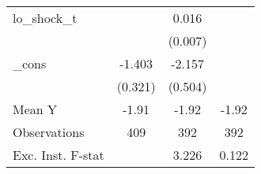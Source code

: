 {\begin{tabular}{l*{3}{c}}
\addlinespace
lo\_shock\_t  &                     &       0.016\sym{**} &                     \\
            &                     &     (0.007)         &                     \\
\addlinespace
\_cons      &      -1.403\sym{***}&      -2.157\sym{***}&                     \\
            &     (0.321)         &     (0.504)         &                     \\
\midrule
Mean Y      &       -1.91         &       -1.92         &       -1.92         \\
Observations&         409         &         392         &         392         \\
Exc. Inst. F-stat&                     &       3.226         &       0.122         \\
\bottomrule
\end{tabular}
}
